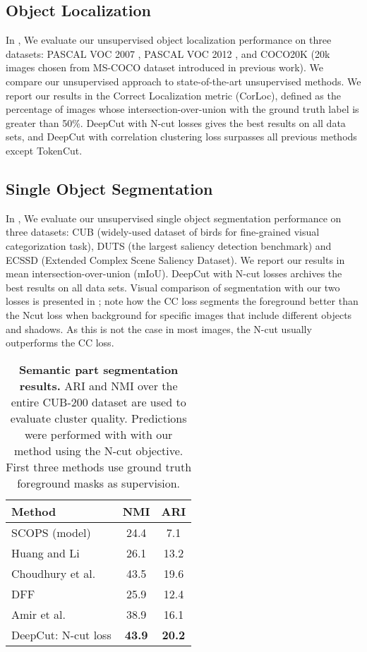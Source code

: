 \documentclass[10pt,twocolumn,letterpaper]{article}
\begin{document}
\subsection{Object Localization}
In  , We evaluate our unsupervised object localization performance on three datasets: PASCAL VOC 2007 \cite{pascal-voc-2007}, PASCAL VOC 2012 \cite{pascal-voc-2012}, 
and COCO20K (20k images chosen from MS-COCO dataset\cite{lin2014microsoft} introduced in previous work\cite{vo2020toward}).
We compare our unsupervised approach to state-of-the-art unsupervised methods.
We report our results in the Correct Localization metric (CorLoc), defined as the percentage of images whose intersection-over-union with the ground truth label is greater than 50\%. 
DeepCut with N-cut losses gives the best results on all data sets, and DeepCut with correlation clustering loss surpasses all previous methods except TokenCut\cite{wang2022self}.

\subsection{Single Object Segmentation}
In , We evaluate our unsupervised single object segmentation performance on three datasets: CUB (widely-used dataset of birds for fine-grained visual categorization task)\cite{cub_2011}, DUTS (the largest saliency detection benchmark)\cite{wang2017} and ECSSD (Extended Complex Scene Saliency Dataset)\cite{yan2013hierarchical}.
We report our results in mean intersection-over-union (mIoU). DeepCut with N-cut losses archives the best results on all data sets. Visual comparison of segmentation with our two losses is presented in ; note how the CC loss segments the foreground better than the Ncut loss when background for specific images that include different objects and shadows. As this is not the case in most images, the N-cut usually outperforms the CC loss.


\begin{table}
  \centering
  \begin{tabular}{@{}lc c@{}}
    \toprule
    Method & NMI  & ARI\\
    \midrule
    SCOPS\cite{hung2019scops} (model) & 24.4 & 7.1\\
    Huang and Li\cite{huang2020interpretable} &  26.1& 13.2 \\
    Choudhury et al.\cite{choudhury2021unsupervised} & 43.5 &   19.6\\
    \midrule
    DFF\cite{collins2018deep} &  25.9 & 12.4\\
    Amir et al.\cite{collins2018deep} &  38.9 & 16.1\\
    \midrule
    DeepCut: N-cut loss&\textbf{43.9} &  \textbf{20.2}\\
    \bottomrule
  \end{tabular}
  \caption{\textbf{Semantic part segmentation results.} ARI and NMI over the entire CUB-200 dataset are used to evaluate cluster quality. Predictions were performed with 
  with our method using the N-cut objective. First three methods use ground truth foreground masks as supervision.}
  \label{tab:semseg}
\end{table}
\end{document}
